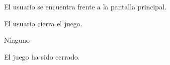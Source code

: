 {
  \item El usuario se encuentra frente a la pantalla principal.
  \item El usuario cierra el juego.
}
{\item Ninguno}{El juego ha sido cerrado.}
